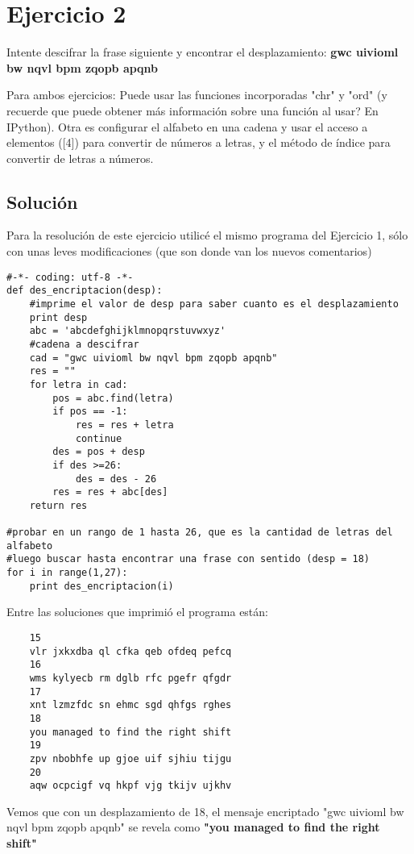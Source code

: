 \documentclass[a4paper,10pt]{article}
\begin{document}
\section*{Ejercicio 2} 
Intente descifrar la frase siguiente y encontrar el desplazamiento:
\textbf{gwc uivioml bw nqvl bpm zqopb apqnb}

Para ambos ejercicios: Puede usar las funciones incorporadas "chr" y "ord" (y recuerde que
puede obtener más información sobre una función al usar? En IPython). Otra es configurar el
alfabeto en una cadena y usar el acceso a elementos ([4]) para convertir de números a letras, y
el método de índice para convertir de letras a números.

\subsection*{Solución}
Para la resolución de este ejercicio utilicé el mismo programa del Ejercicio 1, sólo con unas leves modificaciones (que son donde van los nuevos comentarios)
\begin{verbatim}
#-*- coding: utf-8 -*-
def des_encriptacion(desp):
	#imprime el valor de desp para saber cuanto es el desplazamiento
	print desp
	abc = 'abcdefghijklmnopqrstuvwxyz'
	#cadena a descifrar
	cad = "gwc uivioml bw nqvl bpm zqopb apqnb"
	res = ""
	for letra in cad:
		pos = abc.find(letra)
		if pos == -1:
			res = res + letra
			continue
		des = pos + desp
		if des >=26:
			des = des - 26
		res = res + abc[des]
	return res

#probar en un rango de 1 hasta 26, que es la cantidad de letras del alfabeto
#luego buscar hasta encontrar una frase con sentido (desp = 18)
for i in range(1,27):
	print des_encriptacion(i)
\end{verbatim}
Entre las soluciones que imprimió el programa están: 
\begin{verbatim}
    15
    vlr jxkxdba ql cfka qeb ofdeq pefcq
    16
    wms kylyecb rm dglb rfc pgefr qfgdr
    17
    xnt lzmzfdc sn ehmc sgd qhfgs rghes
    18
    you managed to find the right shift
    19
    zpv nbobhfe up gjoe uif sjhiu tijgu
    20
    aqw ocpcigf vq hkpf vjg tkijv ujkhv
\end{verbatim}
Vemos que con un desplazamiento de 18, el mensaje encriptado "gwc uivioml bw nqvl bpm zqopb apqnb" se revela como \textbf{"you managed to find the right shift"} 
\end{document}
